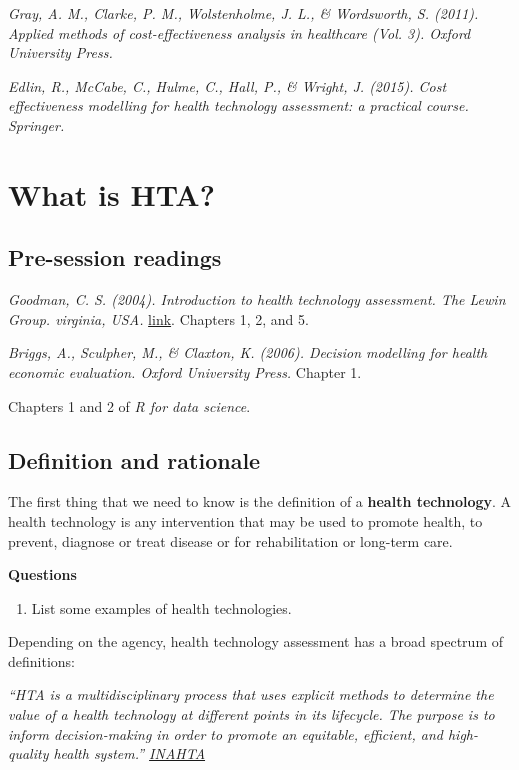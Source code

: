 \documentclass[
]{book}
\providecommand{\tightlist}{%
  \setlength{\itemsep}{0pt}\setlength{\parskip}{0pt}}
\begin{document}
\emph{Gray, A. M., Clarke, P. M., Wolstenholme, J. L., \& Wordsworth, S. (2011). Applied methods of cost-effectiveness analysis in healthcare (Vol. 3). Oxford University Press.}

\emph{Edlin, R., McCabe, C., Hulme, C., Hall, P., \& Wright, J. (2015). Cost effectiveness modelling for health technology assessment: a practical course. Springer.}

\hypertarget{HTA}{%
\chapter{What is HTA?}\label{HTA}}

\hypertarget{pre-session-readings}{%
\section{Pre-session readings}\label{pre-session-readings}}

\emph{Goodman, C. S. (2004). Introduction to health technology assessment. The Lewin Group. virginia, USA.} \href{https://www.nlm.nih.gov/nichsr/hta101/ta10101.html}{link}. Chapters 1, 2, and 5.

\emph{Briggs, A., Sculpher, M., \& Claxton, K. (2006). Decision modelling for health economic evaluation. Oxford University Press.} Chapter 1.

Chapters 1 and 2 of \emph{R for data science}.

\hypertarget{definition-and-rationale}{%
\section{Definition and rationale}\label{definition-and-rationale}}

The first thing that we need to know is the definition of a \textbf{health technology}. A health technology is any intervention that may be used to promote health, to prevent, diagnose or treat disease or for rehabilitation or long-term care.

\textbf{Questions}

\begin{enumerate}
\def\labelenumi{\arabic{enumi}.}
\tightlist
\item
  List some examples of health technologies.
\end{enumerate}

Depending on the agency, health technology assessment has a broad spectrum of definitions:

\emph{``HTA is a multidisciplinary process that uses explicit methods to determine the value of a health technology at different points in its lifecycle. The purpose is to inform decision-making in order to promote an equitable, efficient, and high-quality health system.'' \href{https://www.inahta.org/}{INAHTA}}
\end{document}
